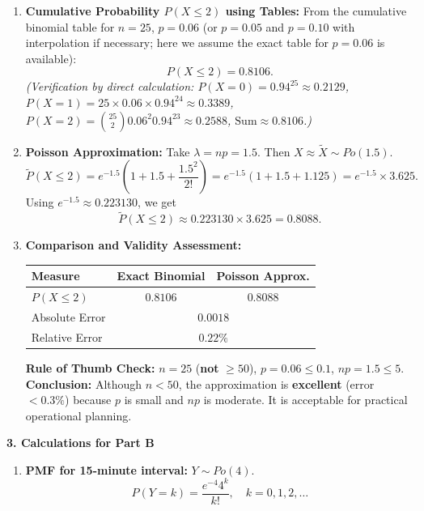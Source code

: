 \documentclass[11pt]{article}
\begin{document}
\begin{exoresolu}
\begin{enumerate}
\item \textbf{Cumulative Probability $P(X \le 2)$ using Tables:}  
      From the cumulative binomial table for $n=25$, $p=0.06$ (or $p=0.05$ and $p=0.10$ with interpolation if necessary; here we assume the exact table for $p=0.06$ is available):
      \[
      P(X \le 2) = \mathbf{0.8106}.
      \]
      \textit{(Verification by direct calculation: $P(X=0)=0.94^{25}\approx 0.2129$, $P(X=1)=25\times0.06\times0.94^{24}\approx 0.3389$, $P(X=2)=\binom{25}{2}0.06^2 0.94^{23}\approx 0.2588$, $\text{Sum} \approx 0.8106$.)}

\item \textbf{Poisson Approximation:} Take $\lambda = np = 1.5$. Then $X \approx \tilde{X} \sim Po(1.5)$.
      \[
      \tilde{P}(X \le 2) = e^{-1.5}\left(1 + 1.5 + \frac{1.5^2}{2!}\right)
      = e^{-1.5}\left(1 + 1.5 + 1.125\right)
      = e^{-1.5} \times 3.625.
      \]
      Using $e^{-1.5} \approx 0.223130$, we get
      \[
      \tilde{P}(X \le 2) \approx 0.223130 \times 3.625 = \mathbf{0.8088}.
      \]

\item \textbf{Comparison and Validity Assessment:}
      \begin{center}
      \begin{tabular}{|l|c|c|}\hline
      \rowcolor{popblueL}
      \textbf{Measure} & \textbf{Exact Binomial} & \textbf{Poisson Approx.} \\ \hline
      $P(X \le 2)$ & $0.8106$ & $0.8088$ \\ \hline
      Absolute Error & \multicolumn{2}{c|}{$0.0018$} \\ \hline
      Relative Error & \multicolumn{2}{c|}{$0.22\%$} \\ \hline
      \end{tabular}
      \end{center}
      \textbf{Rule of Thumb Check:} $n = 25$ (\textbf{not} $\ge 50$), $p = 0.06 \le 0.1$, $np = 1.5 \le 5$.  
      \textbf{Conclusion:} Although $n < 50$, the approximation is \textbf{excellent} (error $< 0.3\%$) because $p$ is small and $np$ is moderate. It is acceptable for practical operational planning.
\end{enumerate}

\textbf{3. Calculations for Part B}

\begin{enumerate}
\item \textbf{PMF for 15-minute interval:} $Y \sim Po(4)$.
      \[
      P(Y = k) = \frac{e^{-4} 4^k}{k!}, \quad k = 0,1,2,\dots
      \]


\end{enumerate}
\end{exoresolu}
\end{document}
